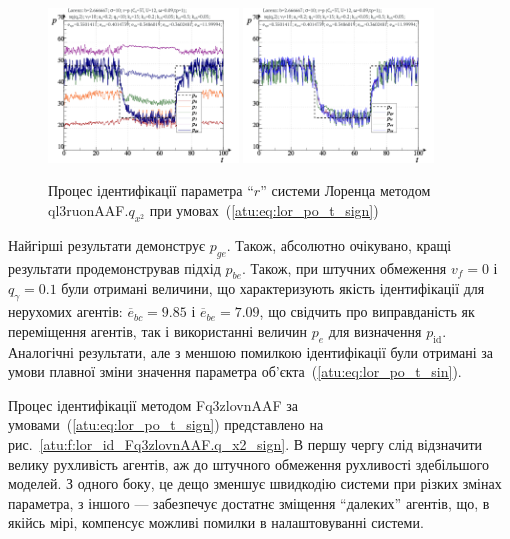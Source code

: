 \documentclass[a4paper,13pt]{atuaref}
\begin{document}
\begin{figure}[ht!]
  \centerline{
    \includegraphics[width=0.45\textwidth]{p5/p/cha/lor/ql3ruonAAF/lor_ql3ruonAAF_qy2-p_t_pi_sign.png}
    \hfill
    \includegraphics[width=0.45\textwidth]{p5/p/cha/lor/ql3ruonAAF/lor_ql3ruonAAF_qy2-p_t_pz_sign.png}
  }
  \caption{Процес ідентифікації параметра ``$r$'' системи Лоренца методом ql3ruonAAF.$q_{x^2}$ при умовах~(\ref{atu:eq:lor_po_t_sign})}
  \label{atu:f:lor_id_ql3ruonAAF.q_x2_sign}
\end{figure}

Найгірші результати демонструє $ p_{ge} $. Також, абсолютно очікувано, кращі
результати продемонстрував підхід $ p_{be}$. Також, при штучних обмеження
$v_f = 0 $ і $ q_\gamma = 0.1 $ були отримані величини, що характеризують
якість ідентифікації для нерухомих агентів:
$ \overline{e}_{bc} = 9.85 $ і
$ \overline{e}_{be} = 7.09 $, що свідчить про виправданість як переміщення
агентів, так і використанні величин $ p_e $ для визначення $ p_\mathrm{id} $.
Аналогічні результати, але з меншою помилкою ідентифікації були отримані за
умови плавної зміни значення параметра об'єкта~(\ref{atu:eq:lor_po_t_sin}).

Процес ідентифікації методом Fq3zlovnAAF за умовами~(\ref{atu:eq:lor_po_t_sign}) представлено
на рис.~\ref{atu:f:lor_id_Fq3zlovnAAF.q_x2_sign}. В першу чергу слід
відзначити велику рухливість агентів, аж до штучного обмеження рухливості
здебільшого моделей. З одного боку, це дещо зменшує швидкодію системи при
різких змінах параметра, з іншого --- забезпечує достатнє зміщення ``далеких''
агентів, що, в якійсь мірі, компенсує можливі помилки в налаштовуванні системи.
\end{document}
